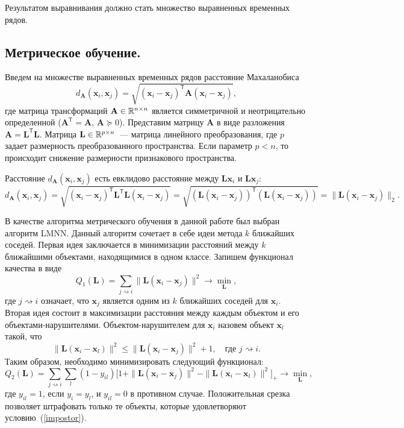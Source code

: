 Результатом выравнивания должно стать множество выравненных временных рядов.

\subsection{Метрическое обучение.}

Введем на множестве выравненных временных рядов расстояние Махаланобиса
\[
d_\mathbf{A} (\mathbf{x}_i, \mathbf{x}_j) = \sqrt{(\mathbf{x}_i - \mathbf{x}_j)^\mathsf{T} \mathbf{A} (\mathbf{x}_i - \mathbf{x}_j)},
\]
где матрица трансформаций $\mathbf{A} \in \mathbb{R}^{n \times n}$ является симметричной и неотрицательно определенной ($\mathbf{A}^\mathsf{T} = \mathbf{A}$, $\mathbf{A} \succeq 0$).
Представим матрицу $\mathbf{A}$ в виде разложения $\mathbf{A} = \mathbf{L}^\mathsf{T}  \mathbf{L}$.
Матрица $\mathbf{L} \in \mathbb{R}^{p \times n}$~--- матрица линейного преобразования, где $p$ задает размерность преобразованного пространства. Если параметр $p < n$, то происходит снижение размерности признакового пространства.

Расстояние $d_\mathbf{A} (\mathbf{x}_i, \mathbf{x}_j)$ есть евклидово расстояние между $\mathbf{Lx}_i$ и $\mathbf{Lx}_j$:
\[
d_\mathbf{A} (\mathbf{x}_i, \mathbf{x}_j) = \sqrt{(\mathbf{x}_i - \mathbf{x}_j)^\mathsf{T} \mathbf{L}^\mathsf{T} \mathbf{L} (\mathbf{x}_i - \mathbf{x}_j)} = \sqrt{(\mathbf{L} (\mathbf{x}_i - \mathbf{x}_j))^\mathsf{T} (\mathbf{L} (\mathbf{x}_i - \mathbf{x}_j))} = \|\mathbf{L} (\mathbf{x}_i - \mathbf{x}_j)\|_2.
\]

В качестве алгоритма метрического обучения в данной работе был выбран алгоритм LMNN. Данный алгоритм сочетает в себе идеи метода $k$ ближайших соседей. Первая идея заключается в минимизации расстояний между $k$ ближайшими объектами, находящимися в одном классе. Запишем функционал качества в виде
\[
Q_1(\mathbf{L}) = \sum_{j \rightsquigarrow i} \|\mathbf{L}(\mathbf{x}_i - \mathbf{x}_j)\|^2 \rightarrow \min_{\mathbf{L}},
\]
где $j \rightsquigarrow i$ означает, что $\mathbf{x}_j$ является одним из $k$ ближайших соседей для $\mathbf{x}_i$.
Вторая идея состоит в максимизации расстояния между каждым объектом и его объектами-нарушителями. Объектом-нарушителем для $\mathbf{x}_i$ назовем объект $\mathbf{x}_l$ такой, что
\begin{equation}
\label{impostor}
\|\mathbf{L}(\mathbf{x}_i - \mathbf{x}_l)\|^2 \leq \|\mathbf{L}(\mathbf{x}_i - \mathbf{x}_j)\|^2 + 1, \quad \text{где $j \rightsquigarrow i$}.
\end{equation}
Таким образом, необходимо минимизировать следующий функционал:
\[
Q_2(\mathbf{L}) = \sum_{j \rightsquigarrow i} \sum_l(1 - y_{il})\bigl[1 + \|\mathbf{L}(\mathbf{x}_i - \mathbf{x}_j)\|^2 - \|\mathbf{L}(\mathbf{x}_i - \mathbf{x}_l)\|^2\bigr]_+ \rightarrow \min_{\mathbf{L}},
\]
где $y_{il} = 1$, если $y_i = y_l$, и $y_{il} = 0$ в противном случае.
Положительная срезка позволяет штрафовать только те объекты, которые удовлетворяют условию~(\ref{impostor}).

